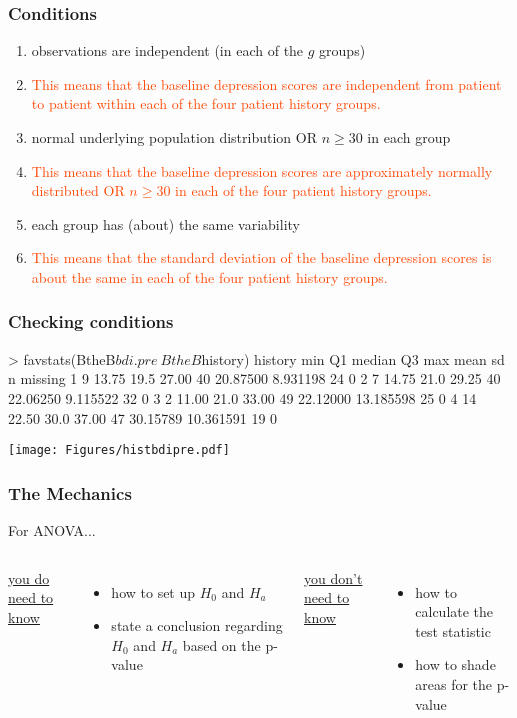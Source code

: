 \begin{frame}
\frametitle{Conditions}
\begin{enumerate}
    \item
    observations are independent (in each of the $g$ groups)
    \item[]
    \textcolor{OrangeRed}{This means that the baseline depression scores are independent from patient to patient within each of the four patient history groups.}
    \item
    normal underlying population distribution OR $n \geq 30$ in each group
    \item[]
    \textcolor{OrangeRed}{This means that the baseline depression scores are approximately normally distributed OR $n \geq 30$ in each of the four patient history groups.}
    \item
    each group has (about) the same variability
    \item[]
    \textcolor{OrangeRed}{This means that the standard deviation of the baseline depression scores is about the same in each of the four patient history groups.}
\end{enumerate}
\end{frame}

\begin{frame}[fragile]
\frametitle{Checking conditions}
\begin{lcverbatim}
> favstats(BtheB$bdi.pre~BtheB$history)
history min    Q1 median    Q3 max     mean        sd  n missing
      1   9 13.75   19.5 27.00  40 20.87500  8.931198 24       0
      2   7 14.75   21.0 29.25  40 22.06250  9.115522 32       0
      3   2 11.00   21.0 33.00  49 22.12000 13.185598 25       0
      4  14 22.50   30.0 37.00  47 30.15789 10.361591 19       0
\end{lcverbatim}
\vskip10pt
\begin{center}
\texttt{[image: Figures/histbdipre.pdf]}
\end{center}
\end{frame}

\begin{frame}
\frametitle{The Mechanics}
For ANOVA...
\vskip10pt
\begin{columns}
\underline{you do need to know}
\begin{itemize}
    \item
    how to set up $H_0$ and $H_a$
    \item
    state a conclusion regarding $H_0$ and $H_a$ based on the p-value
\end{itemize}
\underline{you don't need to know}
\begin{itemize}
    \item
    how to calculate the test statistic
    \item
    how to shade areas for the p-value
\end{itemize}
\end{columns}
\end{frame}

